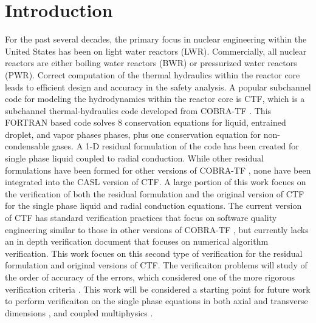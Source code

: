 \vspace*{-80mm}
\chapter{Introduction} \label{chapter1:introduction}

For the past several decades, the primary focus in nuclear engineering within
the United States has been on light water reactors (LWR). Commercially,
all nuclear reactors are either boiling water reactors (BWR) or pressurized
water reactors (PWR). Correct computation of the thermal hydraulics within the
reactor core leads to efficient design and accuracy in the safety analysis. A
popular subchannel code for modeling the hydrodynamics within the reactor core
is CTF, which is a subchannel thermal-hydraulics code developed from
COBRA-TF \cite{Salko2014}. This FORTRAN based code solves 8 conservation
equations for liquid, entrained droplet, and vapor phases phases, plus one
conservation equation for non-condensable gases. A 1-D residual formulation of
the code has been created for single phase liquid coupled to radial conduction.
While other residual formulations have been formed for other versions of
COBRA-TF \cite{Lloyd2014}, none have been integrated into the CASL version of
CTF. A large portion of this work focues on the verification of both the
residual formulation and the original version of CTF for the single phase liquid
and radial conduction equations. The current version of CTF has standard
verification practices that focus on software quality engineering similar to
those in other versions of COBRA-TF \cite{Aumiller2013}, but currently lacks an
in depth verification document that focuses on numerical algorithm verification.
This work focues on this second type of verification for the residual
formulation and original versions of CTF. The verificaiton problems will study
of the order of accuracy of the errors, which considered one of the more
rigorous verification criteria \cite{Roy2005}. This work will be
considered a starting point for future work to perform verificaiton
on the single phase equations in both axial and transverse dimensions
\cite{Merroun2009}, and coupled multiphysics \cite{Mahadevan2009}.

